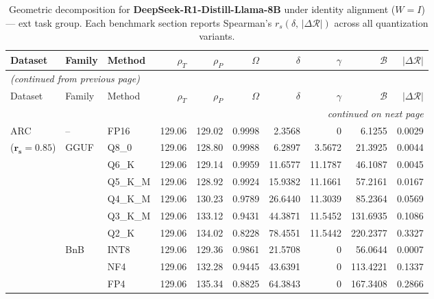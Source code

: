 \begingroup
\small
\setlength{\tabcolsep}{4pt}
\renewcommand{\arraystretch}{1.05}
\setlength{\LTcapwidth}{\textwidth}
\begin{longtable}{ll l rrrrrrr}
\caption{Geometric decomposition for \textbf{DeepSeek-R1-Distill-Llama-8B} under identity alignment ($W{=}I$) --- ext task group. Each benchmark section reports Spearman's $r_s(\delta,\,|\Delta\mathcal{R}|)$ across all quantization variants.}\label{tab:deepseek_decomposition_ext}\\
\toprule
Dataset & Family & Method & $\rho_T$ & $\rho_P$ & $\Omega$ & $\delta$ & $\gamma$ & $\mathcal{B}$ & $|\Delta\mathcal{R}|$ \\
\midrule
\endfirsthead
\multicolumn{10}{l}{\small\itshape (continued from previous page)}\\
\toprule
Dataset & Family & Method & $\rho_T$ & $\rho_P$ & $\Omega$ & $\delta$ & $\gamma$ & $\mathcal{B}$ & $|\Delta\mathcal{R}|$ \\
\midrule
\endhead
\midrule
\multicolumn{10}{r}{\small\itshape continued on next page}\\
\endfoot
\bottomrule
\endlastfoot
ARC & -- & FP16 & 129.06 & 129.02 & 0.9998 & 2.3568 & \cellcolor{cyan!12} $0$ & 6.1255 & 0.0029 \\
{\small ($\mathbf{r_s{=}0.85}$)} & GGUF & Q8\_0 & 129.06 & 128.80 & 0.9988 & 6.2897 & 3.5672 & 21.3925 & 0.0044 \\
 &  & Q6\_K & 129.06 & 129.14 & 0.9959 & 11.6577 & 11.1787 & 46.1087 & 0.0045 \\
 &  & Q5\_K\_M & 129.06 & 128.92 & 0.9924 & 15.9382 & 11.1661 & 57.2161 & 0.0167 \\
 &  & Q4\_K\_M & 129.06 & 130.23 & 0.9789 & 26.6440 & 11.3039 & 85.2364 & 0.0569 \\
 &  & Q3\_K\_M & 129.06 & 133.12 & \cellcolor{red!18} 0.9431 & \cellcolor{red!18} 44.3871 & 11.5452 & \cellcolor{red!18} 131.6935 & \cellcolor{red!18} 0.1086 \\
 &  & Q2\_K & 129.06 & 134.02 & \cellcolor{red!18} 0.8228 & \cellcolor{red!18} 78.4551 & 11.5442 & \cellcolor{red!18} 220.2377 & \cellcolor{red!18} 0.3327 \\
 & BnB & INT8 & 129.06 & 129.36 & 0.9861 & 21.5708 & \cellcolor{cyan!12} $0$ & 56.0644 & 0.0007 \\
 &  & NF4 & 129.06 & 132.28 & \cellcolor{red!18} 0.9445 & \cellcolor{red!18} 43.6391 & \cellcolor{cyan!12} $0$ & \cellcolor{red!18} 113.4221 & \cellcolor{red!18} 0.1337 \\
 &  & FP4 & 129.06 & 135.34 & \cellcolor{red!18} 0.8825 & \cellcolor{red!18} 64.3843 & \cellcolor{cyan!12} $0$ & \cellcolor{red!18} 167.3408 & \cellcolor{red!18} 0.2866 \\

\end{longtable}
